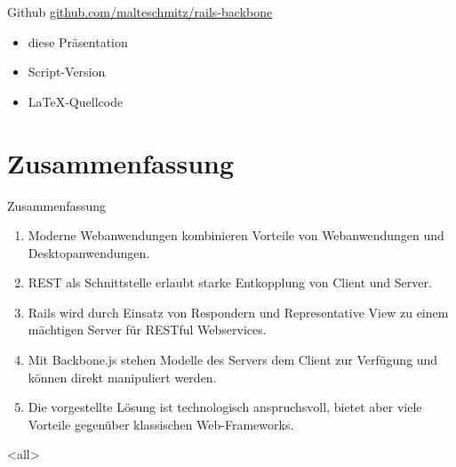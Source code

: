 \newcommand{\authorstring}{Malte Schmitz, Johannes Thorn}
\newcommand{\shortauthorstring}{Malte, Johannes}
\newcommand{\titlestring}{Moderne Webanwendungen\\ mit Rails und Backbone.js}
\newcommand{\shorttitlestring}{Rails \&\only<presentation>{\\} Backbone}
\newcommand{\datestring}{MetaNook 2012}
\newcommand{\titleimage}{\pgfimage[height=12mm]{images/rails}{\huge\bfseries\raisebox{12pt}{\ \&\ }}\pgfimage[height=13mm]{images/backbone}}



\displaytitle


\begin{frame}{Github}
  \url{github.com/malteschmitz/rails-backbone}
  \begin{itemize}
    \item diese Präsentation
    \item Script-Version
    \item \LaTeX-Quellcode
  \end{itemize}
\end{frame}





\section*{Zusammenfassung}

\begin{frame}{Zusammenfassung}
  \begin{enumerate}
    \item \alert{Moderne Webanwendungen} kombinieren \alert{Vorteile von
      Webanwendungen und Desktopanwendungen}.
    \item \alert{REST als Schnittstelle} erlaubt starke
      \alert{Entkopplung von Client und Server}.
    \item \alert{Rails} wird durch Einsatz von \alert{Respondern} und
      \alert{Representative View} zu einem mächtigen Server
      für \alert{RESTful Webservices}.
    \item Mit \alert{Backbone.js} stehen \alert{Modelle} des Servers dem
      Client zur Verfügung und können \alert{direkt manipuliert} werden.
    \item Die vorgestellte Lösung ist \alert{technologisch anspruchsvoll}, bietet
      aber viele \alert{Vorteile gegenüber klassischen Web-Frameworks}.
  \end{enumerate}
\end{frame}

\mode
<all>


